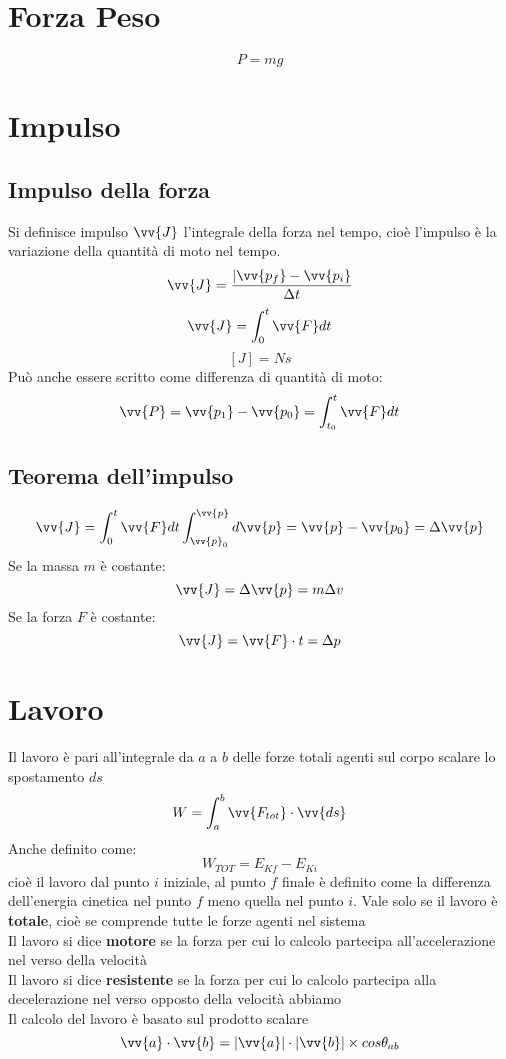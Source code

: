 \documentclass[a4paper]{report}
\begin{document}
  \section{Forza Peso}
  $$ P = mg $$

  \section{Impulso}
  \subsection{Impulso della forza}
  Si definisce impulso $ \vv{J} $ l'integrale della forza nel tempo, cioè l'impulso è la variazione della quantità di moto nel tempo.
  $$ \vv{J} = \frac{|\vv{p_f} - \vv{p_i}}{\Delta t}$$
  $$ \vv{J} = \int_0^t \vv{F} dt $$
  $$ [J] = N  s $$
  Può anche essere scritto come differenza di quantità di moto:
  $$\vv{P} = \vv{p_1} - \vv{p_0} = \int_{t_0}^t \vv{F} dt $$

  \subsection{Teorema dell'impulso}
  $$ \vv{J} = \int_0^t \vv{F} dt \int_{\vv{p}_0}^{\vv{p}} d\vv{p} = \vv{p} - \vv{p_0} = \Delta \vv{p} $$
  Se la massa $m$ è costante:
  $$ \vv{J} = \Delta \vv{p} = m \Delta v $$
  Se la forza $F$ è costante:
  $$ \vv{J} = \vv{F} \cdot t = \Delta p  $$

  \section{Lavoro}
  Il lavoro è pari all'integrale da $a$ a $b$ delle forze totali agenti sul corpo scalare lo spostamento $ds$
  $$ W = \int_{a}^{b} \vv{F_{tot}} \cdot \vv{ds} $$
  Anche definito come:
  $$ W_{TOT} = E_{Kf} - E_{Ki} $$
  cioè il lavoro dal punto $i$ iniziale, al punto $f$ finale è definito come la differenza dell'energia cinetica nel punto $f$ meno quella nel punto $i$. Vale solo se il lavoro è \textbf{totale}, cioè se comprende tutte le forze agenti nel sistema\\
  Il lavoro si dice \textbf{motore} se la forza per cui lo calcolo partecipa all'accelerazione nel verso della velocità\\
  Il lavoro si dice \textbf{resistente} se la forza per cui lo calcolo partecipa alla decelerazione nel verso opposto della velocità
  abbiamo\\
  Il calcolo del lavoro è basato sul prodotto scalare $$\vv{a} \cdot \vv{b} = |\vv{a}| \cdot |\vv{b}| \times cos \theta_{ab}$$
\end{document}

